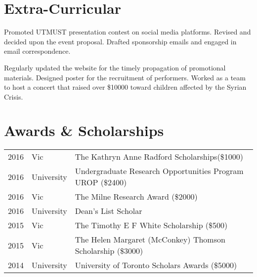 \documentclass[]{deedy-resume-openfont}
\begin{document}
\begin{minipage}[t]{0.66\textwidth}
\section{Extra-Curricular}

Promoted UTMUST presentation contest on social media platforms. Revised and decided upon the event proposal. Drafted sponsorship emails and engaged in email correspondence.
\sectionsep


Regularly updated the website for the timely propagation of promotional materials. Designed poster for the recruitment of performers. Worked as a team to host a concert that raised over \$10000 toward children affected by the Syrian Crisis.
\sectionsep



\section{Awards \& Scholarships}
\begin{tabular}{rll}
2016 		 & Vic		   & The Kathryn Anne Radford Scholarships(\$1000) \\
2016	     & University  & Undergraduate Research Opportunities Program UROP (\$2400) \\
2016	     & Vic  	   & The Milne Research Award (\$2000) \\
2016    	 & University  & Dean’s List Scholar \\
2015 		 & Vic 		   & The Timothy E F White Scholarship (\$500) \\
2015	     & Vic         & The Helen Margaret (McConkey) Thomson Scholarship (\$3000) \\
2014 		 & University  & University of Toronto Scholars Awards (\$5000) \\
\end{tabular}
\sectionsep




\end{minipage}
\end{document}
